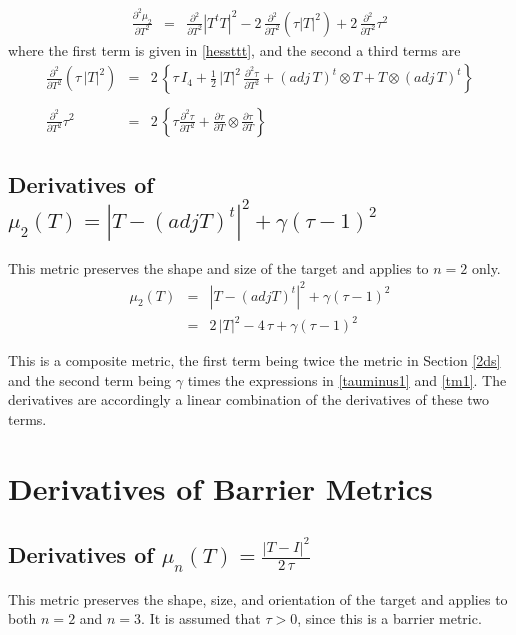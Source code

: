 \documentclass{report}
\begin{document}
\begin{eqnarray}
\frac{\partial^2 \mu_2}{\partial T^2} & = & \frac{\partial^2}{\partial T^2} |T^t T|^2 - 2 \, \frac{\partial^2}{\partial T^2} \left( \tau |T|^2 \right) + 2 \, \frac{\partial^2}{\partial T^2} \tau^2
\end{eqnarray}
where the first term is given in \ref{hessttt}, and the second a third terms are
\begin{eqnarray}
\frac{\partial^2}{\partial T^2} \left( \tau \, |T|^2 \right) & = & 2 \, \left\{ \tau \, I_4 + \frac{1}{2} \, |T|^2 \, \frac{\partial^2 \tau}{\partial T^2} + (adj \, T)^t \otimes T + T \otimes (adj \, T)^t \right\} \nonumber \\
 \\
\frac{\partial^2}{\partial T^2} \tau^2 & = & 2 \, \left\{ \tau \frac{\partial^2 \tau}{\partial T^2} + \frac{\partial \tau}{\partial T} \otimes \frac{\partial \tau}{\partial T} \right\}
\end{eqnarray}

\subsection{Derivatives of $\mu_2(T)=|T-(adj T)^t|^2 + \gamma (\tau-1)^2$}

This metric preserves the shape and size of the target and applies to $n=2$ only.
\begin{eqnarray}
\mu_2 (T) & = & |T-(adj T)^t|^2 + \gamma (\tau-1)^2 \\
          & = & 2 \, |T|^2 - 4 \, \tau  + \gamma (\tau-1)^2
\end{eqnarray}

\noindent This is a composite metric, the first term being twice the 
metric in Section \ref{2ds} and the second term being $\gamma$ times the
expressions in \ref{tauminus1} and \ref{tm1}. The derivatives are accordingly 
a linear combination of the derivatives of these two terms. \newline

\section{Derivatives of Barrier Metrics}

\subsection{Derivatives of $\mu_n(T)=\frac{|T-I|^2}{2 \, \tau}$}

\noindent This metric preserves the shape, size, and orientation of the target
and applies to both $n=2$ and $n=3$. It is assumed that $\tau>0$, since 
this is a barrier metric. \newline
\end{document}
